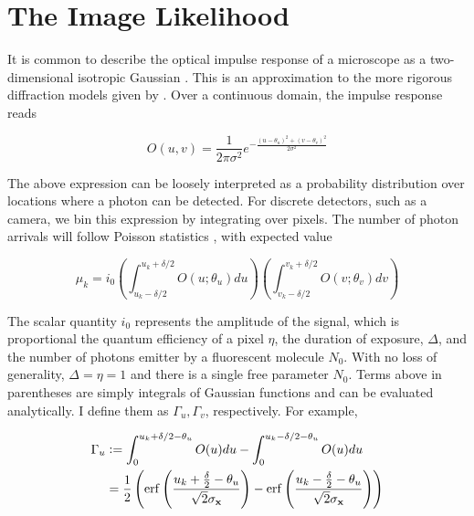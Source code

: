 \section{The Image Likelihood}

It is common to describe the optical impulse response of a microscope as a two-dimensional isotropic Gaussian \parencite{Zhang2007}. This is an approximation to the more rigorous diffraction models given by \parencite{Richards1959,Gibson1989}. Over a continuous domain, the impulse response reads

\begin{equation*}
O(u,v) = \frac{1}{2\pi\sigma^{2}}e^{-\frac{(u-\theta_{u})^{2}+(v-\theta_{v})^{2}}{2\sigma^{2}}}
\end{equation*}

The above expression can be loosely interpreted as a probability distribution over locations where a photon can be detected. For discrete detectors, such as a camera, we bin this expression by integrating over pixels. The number of photon arrivals will follow Poisson statistics \parencite{Smith2010,Huang2013}, with expected value

\begin{equation*}
\mu_{k} = i_{0}\left(\int_{u_{k}-\delta /2}^{u_{k}+\delta /2} O(u; \theta_{u})du \right)\left(\int_{v_{k}-\delta /2}^{v_{k}+\delta /2} O(v;\theta_{v})dv \right)
\end{equation*}

The scalar quantity $i_{0}$ represents the amplitude of the signal, which is proportional the quantum efficiency of a pixel $\eta$, the duration of exposure, $\Delta$, and the number of photons emitter by a fluorescent molecule $N_{0}$. With no loss of generality, $\Delta = \eta = 1$ and there is a single free parameter $N_{0}$. Terms above in parentheses are simply integrals of Gaussian functions and can be evaluated analytically. I define them as $\Gamma_{u},\Gamma_{v}$, respectively. For example,

\begin{align*}
\Gamma_{u} &\vcentcolon =  \int_{0}^{u_{k}+\delta /2 - \theta_{u}} O(u)du - \int_{0}^{u_{k}-\delta /2 - \theta_{u}} O(u)du\\
&= \frac{1}{2}\left(\mathrm{erf}\left(\frac{u_{k}+\frac{\delta}{2}-\theta_{u}}{\sqrt{2}\sigma_{\bold{x}}}\right) -\mathrm{erf}\left(\frac{u_{k}-\frac{\delta}{2}-\theta_{u}}{\sqrt{2}\sigma_{\bold{x}}}\right)\right)
\end{align*}

